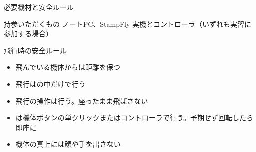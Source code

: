 \begin{frame}{必要機材と安全ルール}
  \begin{block}{持参いただくもの}
    \small ノートPC、StampFly 実機とコントローラ（いずれも実習に参加する場合）
  \end{block}

  \vspace{0.5em}

  \begin{alertblock}{飛行時の安全ルール}
    \begin{itemize}\small\setlength{\itemsep}{2pt}
      \item 飛んでいる機体からは距離を保つ
      \item 飛行はの中だけで行う
      \item 飛行の操作は行う。座ったまま飛ばさない
      \item {} は機体ボタンの単クリックまたはコントローラで行う。予期せず回転したら即座に 
      \item 機体の真上には顔や手を出さない
    \end{itemize}
  \end{alertblock}
\end{frame}
